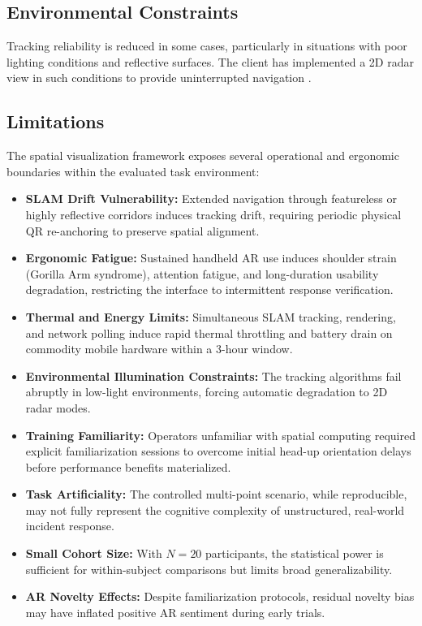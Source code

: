 \documentclass[conference]{IEEEtran}
\begin{document}
\subsection{Environmental Constraints}
Tracking reliability is reduced in some cases, particularly in situations with poor lighting conditions and reflective surfaces. The client has implemented a 2D radar view in such conditions to provide uninterrupted navigation \cite{b24}.

\subsection{Limitations}
The spatial visualization framework exposes several operational and ergonomic boundaries within the evaluated task environment:
\begin{itemize}
    \item \textbf{SLAM Drift Vulnerability:} Extended navigation through featureless or highly reflective corridors induces tracking drift, requiring periodic physical QR re-anchoring to preserve spatial alignment.
    \item \textbf{Ergonomic Fatigue:} Sustained handheld AR use induces shoulder strain (Gorilla Arm syndrome), attention fatigue, and long-duration usability degradation, restricting the interface to intermittent response verification.
    \item \textbf{Thermal and Energy Limits:} Simultaneous SLAM tracking, rendering, and network polling induce rapid thermal throttling and battery drain on commodity mobile hardware within a 3-hour window.
    \item \textbf{Environmental Illumination Constraints:} The tracking algorithms fail abruptly in low-light environments, forcing automatic degradation to 2D radar modes.
    \item \textbf{Training Familiarity:} Operators unfamiliar with spatial computing required explicit familiarization sessions to overcome initial head-up orientation delays before performance benefits materialized.
    \item \textbf{Task Artificiality:} The controlled multi-point scenario, while reproducible, may not fully represent the cognitive complexity of unstructured, real-world incident response.
    \item \textbf{Small Cohort Size:} With $N=20$ participants, the statistical power is sufficient for within-subject comparisons but limits broad generalizability.
    \item \textbf{AR Novelty Effects:} Despite familiarization protocols, residual novelty bias may have inflated positive AR sentiment during early trials.
\end{itemize}
\end{document}
